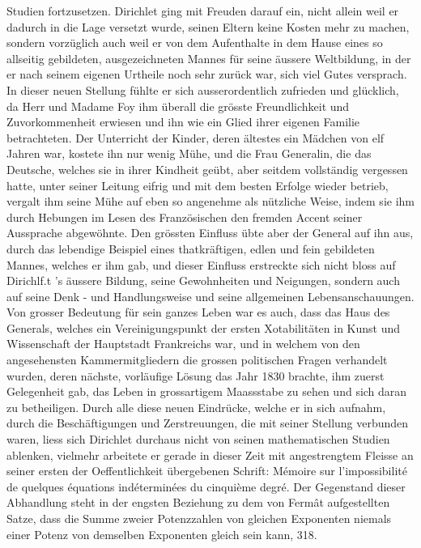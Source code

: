 \documentclass[11pt]{article}
\begin{document}
\noindent Studien fortzusetzen. Dirichlet ging mit Freuden darauf ein, nicht allein weil er dadurch in die Lage versetzt wurde, seinen Eltern keine Kosten mehr zu machen, sondern vorzüglich auch weil er von dem Aufenthalte in dem Hause eines so allseitig gebildeten, ausgezeichneten Mannes für seine äussere Weltbildung, in der er nach seinem eigenen Urtheile noch sehr zurück war, sich viel Gutes versprach. In dieser neuen Stellung fühlte er sich ausserordentlich zufrieden und glücklich, da Herr und Madame Foy ihm überall die grösste Freundlichkeit und Zuvorkommenheit erwiesen und ihn wie ein Glied ihrer eigenen Familie betrachteten. Der Unterricht der Kinder, deren ältestes ein Mädchen von elf Jahren war, kostete ihn nur wenig Mühe, und die Frau Generalin, die das Deutsche, welches sie in ihrer Kindheit geübt, aber seitdem vollständig vergessen hatte, unter seiner Leitung eifrig und mit dem besten Erfolge wieder betrieb, vergalt ihm seine Mühe auf eben so angenehme als nützliche Weise, indem sie ihm durch Hebungen im Lesen des Französischen den fremden Accent seiner Aussprache abgewöhnte. Den grössten Einfluss übte aber der General auf ihn aus, durch das lebendige Beispiel eines thatkräftigen, edlen und fein gebildeten Mannes, welches er ihm gab, und dieser Einfluss erstreckte sich nicht bloss auf Dirichlf.t ’s äussere Bildung, seine Gewohnheiten und Neigungen, sondern auch auf seine Denk - und Handlungsweise und seine allgemeinen Lebensanschauungen. Von grosser Bedeutung für sein ganzes Leben war es auch, dass das Haus des Generals, welches ein Vereinigungspunkt der ersten Xotabilitäten in Kunst und Wissenschaft der Hauptstadt Frankreichs war, und in welchem von den angesehensten Kammermitgliedern die grossen politischen Fragen verhandelt wurden, deren nächste, vorläufige Lösung das Jahr 1830 brachte, ihm zuerst Gelegenheit gab, das Leben in grossartigem Maassstabe zu sehen und sich daran zu betheiligen. Durch alle diese neuen Eindrücke, welche er in sich aufnahm, durch die Beschäftigungen und Zerstreuungen, die mit seiner Stellung verbunden waren, liess sich Dirichlet durchaus nicht von seinen mathematischen Studien ablenken, vielmehr arbeitete er gerade in dieser Zeit mit angestrengtem Fleisse an seiner ersten der Oeffentlichkeit übergebenen Schrift: Mémoire sur l'impossibilité de quelques équations indéterminées du cinquième degré. Der Gegenstand dieser Abhandlung steht in der engsten Beziehung zu dem von Fermât aufgestellten Satze, dass die Summe zweier Potenzzahlen von gleichen Exponenten niemals einer Potenz von demselben Exponenten gleich sein kann, 318.
\par
\end{document}

